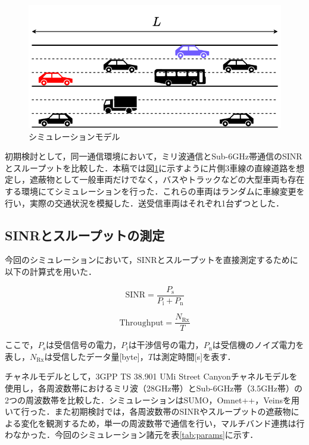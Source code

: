 \documentclass[10pt, twocolumn, a4j, platex]{jsarticle}	%
\newcommand{\wfig}[1]{図\ref{fig:#1}}%
\newcommand{\wtab}[1]{表\ref{tab:#1}}%
\begin{document}
\begin{figure}[tb]
	\centering
	\includegraphics[width=0.95\linewidth]{./images/model.drawio.png}
	\caption{シミュレーションモデル} \label{fig:model}
\end{figure}

初期検討として，同一通信環境において，ミリ波通信とSub-6GHz帯通信のSINRとスループットを比較した．本稿では\wfig{model}に示すように片側3車線の直線道路を想定し，遮蔽物として一般車両だけでなく，バスやトラックなどの大型車両も存在する環境にてシミュレーションを行った．これらの車両はランダムに車線変更を行い，実際の交通状況を模擬した．送受信車両はそれぞれ1台ずつとした．

\subsection{SINRとスループットの測定}

今回のシミュレーションにおいて，SINRとスループットを直接測定するために以下の計算式を用いた．

\begin{equation}
	\mathrm{SINR} = \frac{P_{\mathrm{s}}}{P_{\mathrm{i}} + P_{\mathrm{n}}}
\end{equation}

\begin{equation}
	\mathrm{Throughput} = \frac{N_{\mathrm{Rx}}}{T}
\end{equation}

ここで，$P_{\mathrm{s}}$は受信信号の電力，$P_{\mathrm{i}}$は干渉信号の電力，$P_{\mathrm{n}}$は受信機のノイズ電力を表し，$N_{\mathrm{Rx}}$は受信したデータ量[byte]，$T$は測定時間[s]を表す．

チャネルモデルとして，3GPP TS 38.901 UMi Street Canyonチャネルモデルを使用し，各周波数帯におけるミリ波（28GHz帯）とSub-6GHz帯（3.5GHz帯）の2つの周波数帯を比較した．シミュレーションはSUMO，Omnet++，Veinsを用いて行った．また初期検討では，各周波数帯のSINRやスループットの遮蔽物による変化を観測するため，単一の周波数帯で通信を行い，マルチバンド連携は行わなかった．今回のシミュレーション諸元を\wtab{params}に示す．
\end{document}

